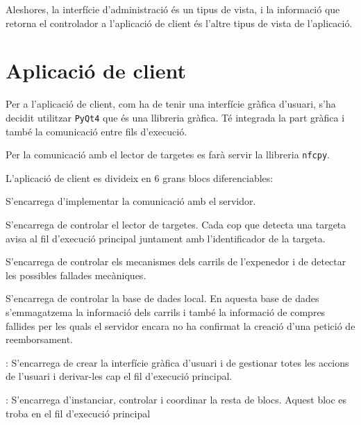 Aleshores, la interfície d'administració és un tipus de vista, i la informació que retorna el controlador a l'aplicació de client és l'altre tipus de vista de l'aplicació.

\section{Aplicació de client}
Per a l'aplicació de client, com ha de tenir una interfície gràfica d'usuari, s'ha decidit utilitzar \texttt{PyQt4}\autocite{pyqt4-tutorial} que és una llibreria gràfica. Té integrada la part gràfica i també la comunicació entre fils d'execució.

Per la comunicació amb el lector de targetes es farà servir la llibreria \texttt{nfcpy}.\autocite{nfcpy}

L'aplicació de client es divideix en 6 grans blocs diferenciables:
\begin{description}[font=\normalfont\textbf]\itemsep2pt 
\vspace{-1em}
\parskip1pt 
\item[comms] S'encarrega d'implementar la comunicació amb el servidor.
\item[card\_reader] S'encarrega de controlar el lector de targetes. Cada cop que detecta una targeta avisa al fil d'execució principal juntament amb l'identificador de la targeta.
\item[column\_controller] S'encarrega de controlar els mecanismes dels carrils de l'expenedor i de detectar les possibles fallades mecàniques.
\item[db\_controller] S'encarrega de controlar la base de dades local. En aquesta base de dades s'emmagatzema la informació dels carrils i també la informació de compres fallides per les quals el servidor encara no ha confirmat la creació d'una petició de reemborsament.
\item[graphic\_ui]: S'encarrega de crear la interfície gràfica d'usuari i de gestionar totes les accions de l'usuari i derivar-les cap el fil d'execució principal.
\item[cocacolero]: S'encarrega d'instanciar, controlar i coordinar la resta de blocs. Aquest bloc es troba en el fil d'execució principal
\vspace{-1em}
\end{description}


